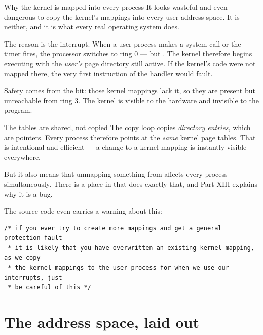 \begin{concept}{Why the kernel is mapped into every process}
It looks wasteful and even dangerous to copy the kernel's mappings into every user address space.
It is neither, and it is what every real operating system does.

The reason is the interrupt. When a user process makes a system call or the timer fires, the
processor switches to ring 0 --- but . The kernel therefore
begins executing with the \emph{user's} page directory still active. If the kernel's code were not
mapped there, the very first instruction of the handler would fault.

Safety comes from the  bit: those kernel mappings lack it, so they are present but
unreachable from ring 3. The kernel is visible to the hardware and invisible to the program.
\end{concept}

\begin{warn}{The tables are shared, not copied}
The copy loop copies \emph{directory entries}, which are pointers. Every process therefore points
at the \emph{same} kernel page tables. That is intentional and efficient --- a change to a kernel
mapping is instantly visible everywhere.

But it also means that unmapping something from  affects every process
simultaneously. There is a place in  that does exactly that, and Part XIII
explains why it is a bug.

The source code even carries a warning about this:
\begin{lstlisting}[style=c]
/* if you ever try to create more mappings and get a general protection fault
 * it is likely that you have overwritten an existing kernel mapping, as we copy
 * the kernel mappings to the user process for when we use our interrupts, just
 * be careful of this */
\end{lstlisting}
\end{warn}

\section{The address space, laid out}

